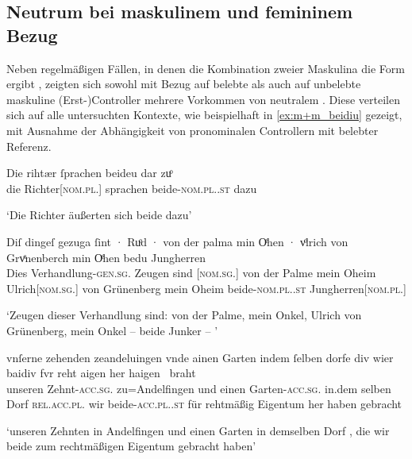\subsection{Neutrum bei maskulinem und femininem Bezug}
\label{subsec:m+m_anim_beidiu}

Neben regelmäßigen Fällen, in denen die Kombination zweier Maskulina die Form
 ergibt%
, zeigten sich sowohl mit Bezug auf belebte als auch auf unbelebte maskuline
(Erst-)Controller mehrere Vorkommen von neutralem . Diese
verteilen sich auf alle untersuchten Kontexte, wie beispielhaft in
\cref{ex:m+m_beidiu} gezeigt, mit Ausnahme der Abhängigkeit von pronominalen
Controllern mit belebter Referenz.

\begin{exe}
\ex \label{ex:m+m_beidiu}
	\begin{xlist}
	\ex \label{ex:m+m_beidiu_1}
		\gll Die rihtær ſprachen beideu {dar zuͦ} \\
			die Richter[\textsc{nom.pl.\MascM}] sprachen beide-\textsc{nom.pl.\NeutM.st}
			dazu \\
		\begin{taggedline}{\parencites[\pno~28\ra, 8]{kc:B1}[vgl.~abweichend][10090]{schroeder1895}} %
		\trans `Die Richter äußerten sich beide dazu'
		\end{taggedline}

	\ex \label{ex:m+m_beidiu_3}
		\gll Diſ dingeſ gezuga ſint · Ruͦd · von der palma
				min Oͤhen · vͦlrich von Grvͤnenberch min Oͤhen
				bedu Jungherren
				\textelp{} \\
			Dies Verhandlung-\textsc{gen.sg.\NeutI} Zeugen sind {}
				[\textsc{nom.sg.\MascM}] {} von der Palme mein Oheim {}
				Ulrich[\textsc{nom.sg.\MascM}] von Grünenberg mein Oheim
				beide-\textsc{nom.pl.\NeutM.st} Jungherren[\textsc{nom.pl.\MascM}]
				{} \\
		\begin{taggedline}{\parencites(Kl.~St.~Urban, Kt.~Luzern, 1298)[\pno~2915, 213.33--35]{cao4}}
		\trans `Zeugen dieser Verhandlung sind:  von der Palme,
			mein Onkel, Ulrich von Grünenberg, mein Onkel -- beide Junker --
			\textelp{}'
		\end{taggedline}

	\ex \label{ex:m+m_beidiu_5}
		\gll vnſerne zehenden zeandeluingen vnde
				ainen Garten indem ſelben dorfe \textelp{}
				div wier baidiv fvr reht aigen her
				haigen~ braht \\
			unseren Zehnt-\textsc{acc.sg.\MascI} zu=Andelfingen und einen
				Garten-\textsc{acc.sg.\MascI} in.dem selben Dorf {}
				\textsc{rel.acc.pl.\NeutI} wir beide-\textsc{acc.pl.\NeutI.st} für
				rehtmäßig Eigentum her haben gebracht \\
		\begin{taggedline}{\parencites(Kl.~Heiligkreuztal, Kr.~Biberach, 1290)[\pno~1201~AB, 472.10--14]{cao2}}
		\trans `unseren Zehnten in Andelfingen und einen Garten in
			demselben Dorf \textelp{}, die wir beide zum rechtmäßigen Eigentum
			gebracht haben'
		\end{taggedline}
	\end{xlist}
\end{exe}

